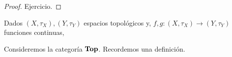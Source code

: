 \documentclass[12pt]{report}
\theoremstyle{largebreak}
\newcommand\cf[3]{\ensuremath{#1:#2\rightarrow#3}}
\newcommand{\Cat}[1]{\ensuremath{\textup{\textbf{#1}}}}
\begin{document}
    \begin{proof}
        Ejercicio.
    \end{proof}

    \begin{mydef}
        Dados $(X,\tau_X),(Y,\tau_Y)$ espacios topológicos y, $\cf{f,g}{(X,\tau_X)}{(Y,\tau_Y)}$ funciones continuas,
    \end{mydef}

    \begin{exa}
        Consideremos la categoría $\Cat{Top}$. Recordemos una definición.
    \end{exa}
\end{document}
